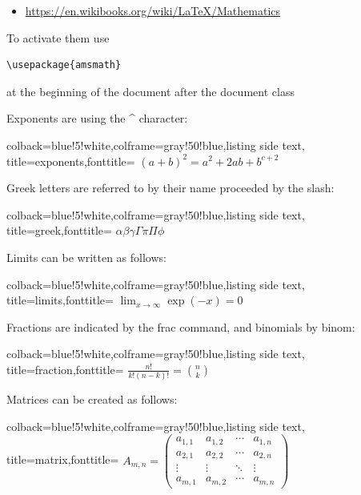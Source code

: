 \begin{itemize}

\item
  \url{https://en.wikibooks.org/wiki/LaTeX/Mathematics}
\end{itemize}

To activate them use 

\begin{verbatim}
\usepackage{amsmath}
\end{verbatim}

at the beginning of the document after the document class

Exponents are using the \^{} character:

\begin{tcblisting}{colback=blue!5!white,colframe=gray!50!blue,listing side text,
  title=exponents,fonttitle=\bfseries}
${(a+b)}^2 = a^2 + 2ab + b^{c+2}$
\end{tcblisting} 

Greek letters are referred to by their name proceeded by the slash:

\begin{tcblisting}{colback=blue!5!white,colframe=gray!50!blue,listing side text,
  title=greek,fonttitle=\bfseries}
$ \alpha \beta \gamma \Gamma \pi \Pi \phi $
\end{tcblisting}


Limits can be written as follows:

\begin{tcblisting}{colback=blue!5!white,colframe=gray!50!blue,listing side text,  title=limits,fonttitle=\bfseries}
$ \lim_{x \to \infty} \exp(-x) = 0 $
\end{tcblisting}

Fractions are indicated by the frac command, and binomials by binom:

\begin{tcblisting}{colback=blue!5!white,colframe=gray!50!blue,listing side text,  title=fraction,fonttitle=\bfseries}
$ \frac{n!}{k!(n-k)!} = \binom{n}{k} $   
\end{tcblisting}

Matrices can be created as follows:

\begin{tcblisting}{colback=blue!5!white,colframe=gray!50!blue,listing side text,  title=matrix,fonttitle=\bfseries}
$ A_{m,n} = 
\begin{pmatrix}
  a_{1,1} & a_{1,2} & \cdots & a_{1,n} \\
  a_{2,1} & a_{2,2} & \cdots & a_{2,n} \\
  \vdots  & \vdots  & \ddots & \vdots  \\
  a_{m,1} & a_{m,2} & \cdots & a_{m,n} 
\end{pmatrix} $
\end{tcblisting}



